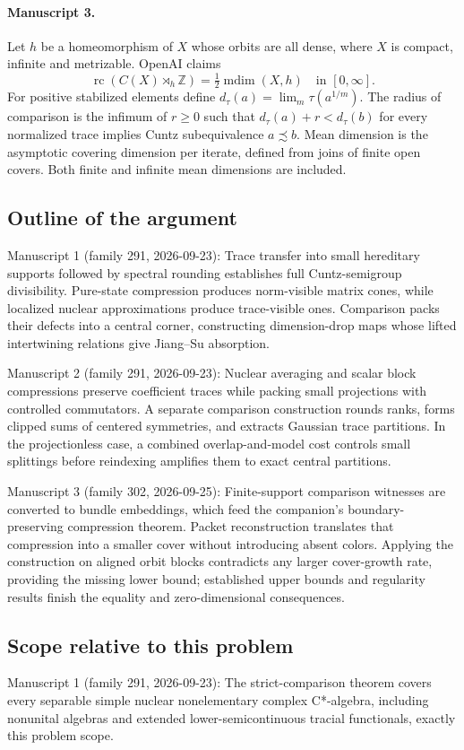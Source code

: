 \documentclass[11pt]{article}
\begin{document}
\paragraph{Manuscript 3.}
Let $h$ be a homeomorphism of $X$ whose orbits are all dense, where $X$ is compact, infinite and metrizable. OpenAI claims
\[
\operatorname{rc}(C(X)\rtimes_h\mathbb Z)=\tfrac12\operatorname{mdim}(X,h)\quad\text{in }[0,\infty].
\]
For positive stabilized elements define $d_\tau(a)=\lim_m\tau(a^{1/m})$. The radius of comparison is the infimum of $r\ge0$ such that $d_\tau(a)+r<d_\tau(b)$ for every normalized trace implies Cuntz subequivalence $a\precsim b$. Mean dimension is the asymptotic covering dimension per iterate, defined from joins of finite open covers. Both finite and infinite mean dimensions are included.

\subsection{Outline of the argument}
Manuscript 1 (family 291, 2026-09-23): Trace transfer into small hereditary supports followed by spectral rounding establishes full Cuntz-semigroup divisibility. Pure-state compression produces norm-visible matrix cones, while localized nuclear approximations produce trace-visible ones. Comparison packs their defects into a central corner, constructing dimension-drop maps whose lifted intertwining relations give Jiang--Su absorption.

Manuscript 2 (family 291, 2026-09-23): Nuclear averaging and scalar block compressions preserve coefficient traces while packing small projections with controlled commutators. A separate comparison construction rounds ranks, forms clipped sums of centered symmetries, and extracts Gaussian trace partitions. In the projectionless case, a combined overlap-and-model cost controls small splittings before reindexing amplifies them to exact central partitions.

Manuscript 3 (family 302, 2026-09-25): Finite-support comparison witnesses are converted to bundle embeddings, which feed the companion's boundary-preserving compression theorem. Packet reconstruction translates that compression into a smaller cover without introducing absent colors. Applying the construction on aligned orbit blocks contradicts any larger cover-growth rate, providing the missing lower bound; established upper bounds and regularity results finish the equality and zero-dimensional consequences.

\subsection{Scope relative to this problem}
Manuscript 1 (family 291, 2026-09-23): The strict-comparison theorem covers every separable simple nuclear nonelementary complex C*-algebra, including nonunital algebras and extended lower-semicontinuous tracial functionals, exactly this problem scope.
\end{document}
